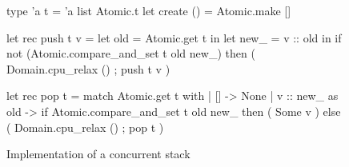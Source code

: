 \begin{figure}[t!]
\begin{ocamlcode}
type 'a t = 'a list Atomic.t
let create () = Atomic.make []

let rec push t v =
  let old = Atomic.get t in
  let new_ = v :: old in
  if not (Atomic.compare_and_set t old new_) then (
    Domain.cpu_relax () ;
    push t v
  )

let rec pop t =
  match Atomic.get t with
  | [] -> None
  | v :: new_ as old ->
      if Atomic.compare_and_set t old new_ then (
        Some v
      ) else (
        Domain.cpu_relax () ;
        pop t
      )
\end{ocamlcode}
\caption{Implementation of a concurrent stack}
\label{fig:stack}
\end{figure}
